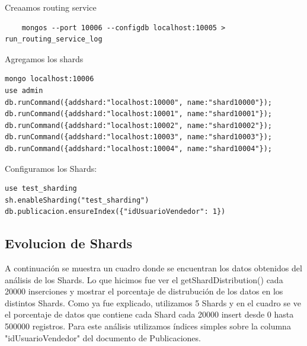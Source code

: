 \documentclass[a4paper, 10pt, twoside]{article}
\begin{document}
Creaamos routing service

\begin{verbatim}
    mongos --port 10006 --configdb localhost:10005 > run_routing_service_log
\end{verbatim}


Agregamos los shards

\begin{verbatim}
mongo localhost:10006
use admin
db.runCommand({addshard:"localhost:10000", name:"shard10000"});
db.runCommand({addshard:"localhost:10001", name:"shard10001"});
db.runCommand({addshard:"localhost:10002", name:"shard10002"});
db.runCommand({addshard:"localhost:10003", name:"shard10003"});
db.runCommand({addshard:"localhost:10004", name:"shard10004"});
\end{verbatim}

Configuramos los Shards:

\begin{verbatim}
use test_sharding
sh.enableSharding("test_sharding")
db.publicacion.ensureIndex({"idUsuarioVendedor": 1})
\end{verbatim}

\subsection{Evolucion de Shards}

A continuaci\'on se muestra un cuadro donde se encuentran los datos obtenidos del an\'alisis de los Shards. Lo que hicimos fue ver el getShardDistribution() cada 20000 inserciones y mostrar el porcentaje de distrubuci\'on de los datos en los distintos Shards.
Como ya fue explicado, utilizamos 5 Shards y en el cuadro se ve el porcentaje de datos que contiene cada Shard cada 20000 insert desde 0 hasta 500000 registros.
Para este an\'alisis utilizamos \'indices simples sobre la columna "idUsuarioVendedor" del documento de Publicaciones.
\end{document}
